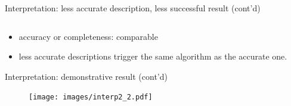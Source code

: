 \documentclass[10pt]{beamer}
\begin{document}
\begin{frame}{Interpretation: less accurate description, less successful result (cont'd)}
\begin{figure}
\begin{tabular}{*{5}{c}|*{5}{c}}
\end{tabular}
\end{figure}
\addtolength{\tabcolsep}{6pt}

\begin{exampleblock}{}
\begin{itemize}
\item accuracy or completeness: comparable 
\item less accurate descriptions trigger the same algorithm as the accurate one.
\end{itemize}
\end{exampleblock}

\end{frame}

\begin{frame}{Interpretation: demonstrative result (cont'd)}

\begin{figure}
\centering
\texttt{[image: images/interp2\_2.pdf]}
\end{figure}

\end{frame}
\end{document}
